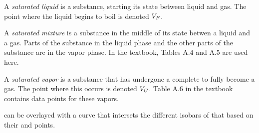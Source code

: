 \begin{definition}\label{def:Saturated_Liquid}
  A \emph{saturated liquid} is a substance, starting its  state between liquid and gas.
  The point where the liquid begins to boil is denoted $V_{F}$.
\end{definition}

\begin{definition}\label{def:Saturated_Mixture}
  A \emph{saturated mixture} is a substance in the middle of its  state betwen a liquid and a gas.
  Parts of the substance in the liquid phase and the other parts of the substance are in the vapor phase.
  In the textbook, Tables A.4 and A.5 are used here.
\end{definition}

\begin{definition}\label{def:Saturated_Vapor}
  A \emph{saturated vapor} is a substance that has undergone a complete  to fully become a gas.
  The point where this occurs is denoted $V_{G}$.
  Table A.6 in the textbook contains data points for these vapors.
\end{definition}

 can be overlayed with a curve that intersets the different isobars of that  based on their  and  points.



